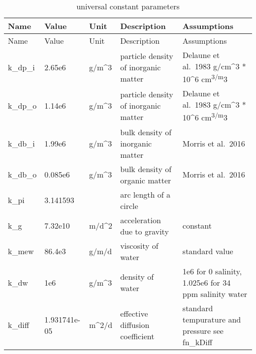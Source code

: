 \documentclass[
]{article}
\begin{document}
\begin{longtable}[]{@{}lllll@{}}
\caption{universal constant parameters}\tabularnewline
\toprule\noalign{}
Name & Value & Unit & Description & Assumptions \\
\midrule\noalign{}
\endfirsthead
\toprule\noalign{}
Name & Value & Unit & Description & Assumptions \\
\midrule\noalign{}
\endhead
\bottomrule\noalign{}
\endlastfoot
k\_dp\_i & 2.65e6 & g/m\^{}3 & particle density of inorganic matter &
Delaune et al.~1983 g/cm\^{}3 * 10\^{}6 cm\textsuperscript{3/m}3 \\
k\_dp\_o & 1.14e6 & g/m\^{}3 & particle density of inorganic matter &
Delaune et al.~1983 g/cm\^{}3 * 10\^{}6 cm\textsuperscript{3/m}3 \\
k\_db\_i & 1.99e6 & g/m\^{}3 & bulk density of inorganic matter & Morris
et al.~2016 \\
k\_db\_o & 0.085e6 & g/m\^{}3 & bulk density of organic matter & Morris
et al.~2016 \\
k\_pi & 3.141593 & & arc length of a circle & \\
k\_g & 7.32e10 & m/d\^{}2 & acceleration due to gravity & constant \\
k\_mew & 86.4e3 & g/m/d & viscosity of water & standard value \\
k\_dw & 1e6 & g/m\^{}3 & density of water & 1e6 for 0 salinity, 1.025e6
for 34 ppm salinity water \\
k\_diff & 1.931741e-05 & m\^{}2/d & effective diffusion coefficient &
standard tempurature and pressure see fn\_kDiff \\
\end{longtable}
\end{document}
